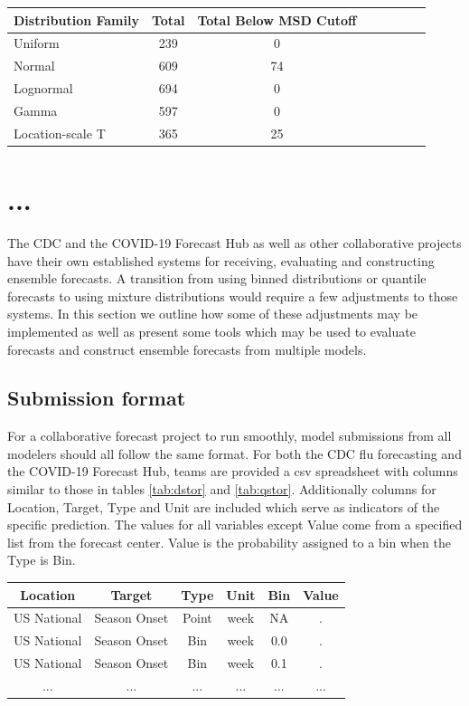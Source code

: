 \documentclass{article}\usepackage[]{graphicx}\usepackage[]{color}
\begin{document}
\begin{table}[h!]
  \centering
  \begin{tabular}{l*{6}{c}r}
  Distribution Family   & Total    & Total Below MSD Cutoff \\
  \hline
  Uniform               & 239      & 0        \\
  Normal                & 609      & 74       \\
  Lognormal             & 694      & 0        \\
  Gamma                 & 597      & 0        \\
  Location-scale T      & 365      & 25       \\
  \end{tabular}
\end{table}

\section{...}



The CDC and the COVID-19 Forecast Hub as well as other collaborative projects
have their own established systems for receiving, 
evaluating and constructing ensemble forecasts. A transition from using binned 
distributions or quantile forecasts to using mixture distributions would require
a few adjustments to those systems. In this section we outline how some of these
adjustments may be implemented as well as present some tools which may be used
to evaluate forecasts and construct ensemble forecasts from multiple models.

\subsection{Submission format}
For a collaborative forecast project to run smoothly, model submissions from all 
modelers should all follow the same format. For both the CDC flu forecasting and
the COVID-19 Forecast Hub, teams are provided a csv spreadsheet with columns 
similar to those in tables \ref{tab:dstor} and \ref{tab:qstor}. Additionally
columns for Location, Target, Type and Unit are included which serve as
indicators of the specific prediction. The values for all variables except 
Value come from a specified list from the forecast center. Value is the 
probability assigned to a bin when the Type is Bin.

\begin{table}[h!]
\label{tab:dstan}
\centering
 \begin{tabular}{|c|c|c|c|c|c|}
 \hline
    Location & Target & Type & Unit & Bin & Value  \\ \hline
    US National & Season Onset & Point & week & NA & . \\
    US National & Season Onset & Bin & week & 0.0 & . \\
    US National & Season Onset & Bin & week & 0.1 & . \\
    ... & ... & ... & ... & ... & ... \\
 \hline
 \end{tabular}
\end{table}
\end{document}
